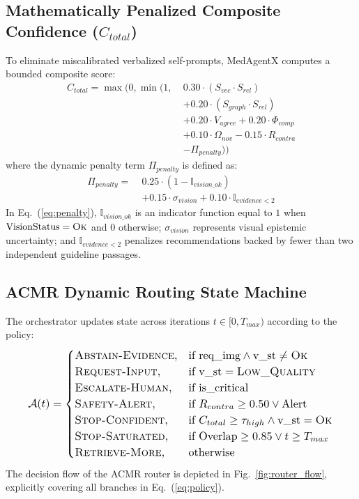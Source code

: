 \documentclass[journal,10pt,twocolumn]{IEEEtran}
\begin{document}
\subsection{Mathematically Penalized Composite Confidence ($C_{total}$)}
To eliminate miscalibrated verbalized self-prompts, MedAgentX computes a bounded composite score:
\begin{align}
C_{total} = \max\Big(0, \min\Big(1, \;& 0.30 \cdot (S_{vec} \cdot S_{rel}) \nonumber \\
& + 0.20 \cdot (S_{graph} \cdot S_{rel}) \nonumber \\
& + 0.20 \cdot V_{agree} + 0.20 \cdot \Phi_{comp} \nonumber \\
& + 0.10 \cdot \Omega_{nov} - 0.15 \cdot R_{contra} \nonumber \\
& - \Pi_{penalty}\Big)\Big)
\label{eq:composite_confidence}
\end{align}
where the dynamic penalty term $\Pi_{penalty}$ is defined as:
\begin{equation}
\begin{split}
\Pi_{penalty} = \; & 0.25 \cdot (1 - \mathbb{I}_{vision\_ok}) \\
& + 0.15 \cdot \sigma_{vision} + 0.10 \cdot \mathbb{I}_{evidence < 2}
\end{split}
\label{eq:penalty}
\end{equation}
In Eq.~(\ref{eq:penalty}), $\mathbb{I}_{vision\_ok}$ is an indicator function equal to $1$ when $\text{VisionStatus} = \textsc{Ok}$ and $0$ otherwise; $\sigma_{vision}$ represents visual epistemic uncertainty; and $\mathbb{I}_{evidence < 2}$ penalizes recommendations backed by fewer than two independent guideline passages.

\subsection{ACMR Dynamic Routing State Machine}
The orchestrator updates state across iterations $t \in [0, T_{max})$ according to the policy:
\begin{equation}
\resizebox{0.91\columnwidth}{!}{$\displaystyle
\mathcal{A}(t) = 
\begin{cases}
\textsc{Abstain-Evidence}, & \text{if } \text{req\_img} \land \text{v\_st} \neq \textsc{Ok} \\
\textsc{Request-Input}, & \text{if } \text{v\_st} = \textsc{Low\_Quality} \\
\textsc{Escalate-Human}, & \text{if } \text{is\_critical} \\
\textsc{Safety-Alert}, & \text{if } R_{contra} \ge 0.50 \lor \text{Alert} \\
\textsc{Stop-Confident}, & \text{if } C_{total} \ge \tau_{high} \land \text{v\_st} = \textsc{Ok} \\
\textsc{Stop-Saturated}, & \text{if } \text{Overlap} \ge 0.85 \lor t \ge T_{max} \\
\textsc{Retrieve-More}, & \text{otherwise}
\end{cases}$}
\label{eq:policy}
\end{equation}
The decision flow of the ACMR router is depicted in Fig.~\ref{fig:router_flow}, explicitly covering all branches in Eq.~(\ref{eq:policy}).
\end{document}
